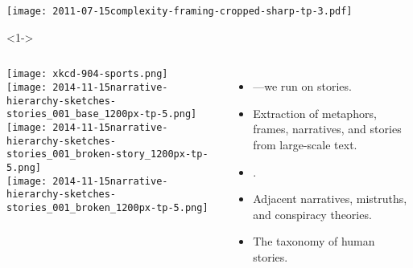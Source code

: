 \begin{frame}

  \texttt{[image: 2011-07-15complexity-framing-cropped-sharp-tp-3.pdf]}

\end{frame}

\begin{frame}
  \small
 
  \begin{block}<1->{}
    \begin{columns}
      \texttt{[image: xkcd-904-sports.png]}\\
      {\tiny
      }
      \texttt{[image: 2014-11-15narrative-hierarchy-sketches-stories\_001\_base\_1200px-tp-5.png]}\\
      \texttt{[image: 2014-11-15narrative-hierarchy-sketches-stories\_001\_broken-story\_1200px-tp-5.png]}\\
      \texttt{[image: 2014-11-15narrative-hierarchy-sketches-stories\_001\_broken\_1200px-tp-5.png]}\\
      \begin{itemize}
      \item<1->
        ---we run on stories.
      \item<1->
        Extraction of metaphors, frames, narratives, and stories from large-scale text.
      \item<1-> 
        .
      \item<1-> 
        Adjacent narratives, mistruths, and conspiracy theories.
      \item<1-> 
        The taxonomy of human stories.
      \end{itemize}
      \centering

\end{columns}
\end{block}
\end{frame}
